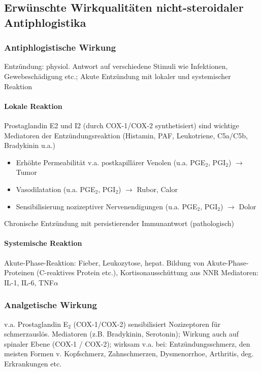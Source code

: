 \documentclass[10pt,a4paper]{report}
\begin{document}
\subsection{Erwünschte Wirkqualitäten nicht-steroidaler Antiphlogistika} %
\label{ssub:erw_nschte_wirkqualit_ten_nicht_steroidaler_antiphlogistika}
\subsubsection{Antiphlogistische Wirkung} %
\label{par:antiphlogistische_wirkung}
Entzündung:	physiol. Antwort auf verschiedene Stimuli wie Infektionen, Gewebeschädigung etc.; Akute Entzündung mit lokaler und systemischer Reaktion\\
\paragraph{Lokale Reaktion} %
\label{subp:subparagraph_name}
Prostaglandin E2 und I2 (durch COX-1/COX-2 synthetisiert) sind wichtige Mediatoren der Entzündungsreaktion (Histamin, PAF, Leukotriene, C5a/C5b, Bradykinin u.a.)\\
\begin{itemize}
	\item Erhöhte Permeabilität v.a. postkapillärer Venolen (u.a. PGE$_2$, PGI$_2$) $\rightarrow$ Tumor 
	\item Vasodilatation (u.a. PGE$_2$, PGI$_2$) $\rightarrow$ Rubor, Calor 
	\item Sensibilisierung nozizeptiver Nervenendigungen (u.a. PGE$_2$, PGI$_2$) $\rightarrow$ Dolor 
\end{itemize}
Chronische Entzündung mit persistierender Immunantwort (pathologisch) 
\paragraph{Systemische Reaktion} %
\label{subp:subparagraph_name}
Akute-Phase-Reaktion:  Fieber, Leukozytose, hepat. Bildung von Akute-Phase-Proteinen (C-reaktives Protein etc.), Kortisonausschüttung aus NNR Mediatoren:  IL-1, IL-6, TNF$\alpha$
\subsubsection{Analgetische Wirkung} %
\label{par:analgetische_wirkung}
v.a. Prostaglandin E$_2$ (COX-1/COX-2) sensibilisiert Nozizeptoren für schmerzauslös. Mediatoren (z.B. Bradykinin, Serotonin); Wirkung auch auf spinaler Ebene (COX-1 / COX-2); wirksam v.a. bei: Entzündungsschmerz, den meisten Formen v. Kopfschmerz, Zahnschmerzen, Dysmenorrhoe, Arthritis, deg. Erkrankungen etc.
\end{document}
